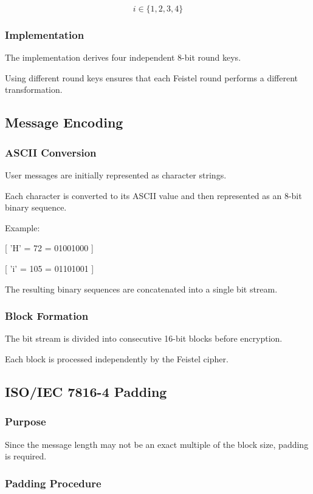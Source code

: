 \documentclass[12pt]{article}
\begin{document}
\[
i \in \{1,2,3,4\}
\]

\subsubsection{Implementation}

The implementation derives four independent 8-bit round keys.

Using different round keys ensures that each Feistel round performs a different transformation.

\subsection{Message Encoding}

\subsubsection{ASCII Conversion}

User messages are initially represented as character strings.

Each character is converted to its ASCII value and then represented as an 8-bit binary sequence.

Example:

[
'H' = 72 = 01001000
]

[
'i' = 105 = 01101001
]

The resulting binary sequences are concatenated into a single bit stream.

\subsubsection{Block Formation}

The bit stream is divided into consecutive 16-bit blocks before encryption.

Each block is processed independently by the Feistel cipher.

\subsection{ISO/IEC 7816-4 Padding}

\subsubsection{Purpose}

Since the message length may not be an exact multiple of the block size, padding is required.

\subsubsection{Padding Procedure}
\end{document}
